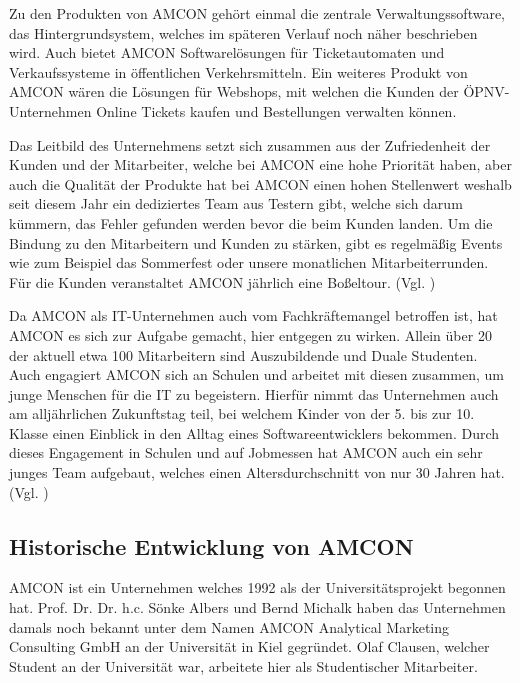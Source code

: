         Zu den Produkten von AMCON gehört einmal die zentrale Verwaltungssoftware, das Hintergrundsystem, welches im 
        späteren Verlauf noch näher beschrieben wird. Auch bietet AMCON Softwarelösungen für Ticketautomaten und  
        Verkaufssysteme in öffentlichen Verkehrsmitteln. Ein weiteres Produkt von AMCON wären die Lösungen für Webshops,
        mit welchen die Kunden der ÖPNV-Unternehmen Online Tickets kaufen und Bestellungen verwalten können.

        Das Leitbild des Unternehmens setzt sich zusammen aus der Zufriedenheit der Kunden und der Mitarbeiter, welche
        bei AMCON eine hohe Priorität haben, aber auch die Qualität der Produkte hat bei AMCON einen hohen Stellenwert 
        weshalb seit diesem Jahr ein dediziertes Team aus Testern gibt, welche sich darum kümmern, das Fehler gefunden 
        werden bevor die beim Kunden landen. Um die Bindung zu den Mitarbeitern und Kunden zu stärken, gibt es 
        regelmäßig Events wie zum Beispiel das Sommerfest oder unsere monatlichen Mitarbeiterrunden. Für die Kunden 
        veranstaltet AMCON jährlich eine Boßeltour. (Vgl. \cite{AMC22c})

        Da AMCON als IT-Unternehmen auch vom Fachkräftemangel betroffen ist, hat AMCON es sich zur Aufgabe gemacht, hier
        entgegen zu wirken. Allein über 20 der aktuell etwa 100 Mitarbeitern sind Auszubildende und Duale Studenten.
        Auch engagiert AMCON sich an Schulen und arbeitet mit diesen zusammen, um junge Menschen für die IT zu 
        begeistern. Hierfür nimmt das Unternehmen auch am alljährlichen Zukunftstag teil, bei welchem Kinder von der 
        5. bis zur 10. Klasse einen Einblick in den Alltag eines Softwareentwicklers bekommen. Durch dieses Engagement 
        in Schulen und auf Jobmessen hat AMCON auch ein sehr junges Team aufgebaut, welches einen Altersdurchschnitt von
        nur 30 Jahren hat. (Vgl. \cite{AMC22c})
        \pagebreak

    \subsection{Historische Entwicklung von AMCON}
        AMCON ist ein Unternehmen welches 1992 als der Universitätsprojekt begonnen hat. Prof. Dr. Dr. h.c. Sönke Albers
        und Bernd Michalk haben das Unternehmen damals noch bekannt unter dem Namen AMCON Analytical Marketing 
        Consulting GmbH an der Universität in Kiel gegründet. Olaf Clausen, welcher Student an der Universität war,
        arbeitete hier als Studentischer Mitarbeiter.

